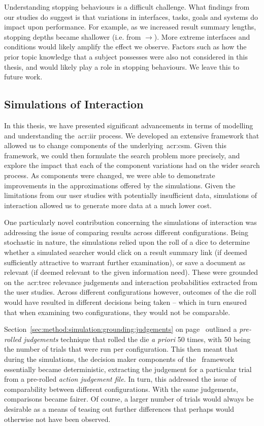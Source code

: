 Understanding stopping behaviours is a difficult challenge. What findings from our studies do suggest is that variations in interfaces, tasks, goals and systems do impact upon performance. For example, as we increased result summary lengths, stopping depths became shallower (i.e. from $\rightarrow$). More extreme interfaces and conditions would likely amplify the effect we observe. Factors such as how the prior topic knowledge that a subject possesses were also not considered in this thesis, and would likely play a role in stopping behaviours. We leave this to future work.

\subsection{Simulations of Interaction}\label{sec:conclusions:discussion:simulations}
In this thesis, we have presented significant advancements in terms of modelling and understanding the~\gls{acr:iir} process. We developed an extensive framework that allowed us to change components of the underlying~\gls{acr:csm}. Given this framework, we could then formulate the search problem more precisely, and explore the impact that each of the component variations had on the wider search process. As components were changed, we were able to demonstrate improvements in the approximations offered by the simulations. Given the limitations from our user studies with potentially insufficient data, simulations of interaction allowed us to generate more data at a much lower cost.

One particularly novel contribution concerning the simulations of interaction was addressing the issue of comparing results across different configurations. Being stochastic in nature, the simulations relied upon the roll of a dice to determine whether a simulated searcher would click on a result summary link (if deemed sufficiently attractive to warrant further examination), or save a document as relevant (if deemed relevant to the given information need). These were grounded on the~\gls{acr:trec} relevance judgements and interaction probabilities extracted from the user studies. Across different configurations however, outcomes of the die roll would have resulted in different decisions being taken -- which in turn ensured that when examining two configurations, they would not be comparable.

Section~\ref{sec:method:simulation:grounding:judgements} on page~\pageref{sec:method:simulation:grounding:judgements} outlined a \emph{pre-rolled judgements} technique that rolled the die \emph{a priori} 50 times, with 50 being the number of trials that were run per configuration. This then meant that during the simulations, the decision maker components of the \simiir~framework essentially became deterministic, extracting the judgement for a particular trial from a pre-rolled \emph{action judgement file.} In turn, this addressed the issue of comparability between different configurations. With the same judgements, comparisons became fairer. Of course, a larger number of trials would always be desirable as a means of teasing out further differences that perhaps would otherwise not have been observed.

